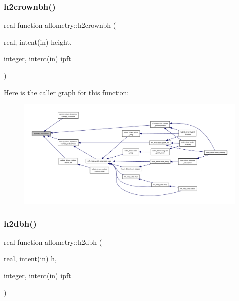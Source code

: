 \subsubsection{\texorpdfstring{h2crownbh()}{h2crownbh()}}
{\footnotesize\ttfamily real function allometry\+::h2crownbh (\begin{DoxyParamCaption}\item[{real, intent(in)}]{height,  }\item[{integer, intent(in)}]{ipft }\end{DoxyParamCaption})}

Here is the caller graph for this function\+:
\nopagebreak
\begin{figure}[H]
\begin{center}
\leavevmode
\includegraphics[width=350pt]{namespaceallometry_a88949ed487fccc2f1dfd065399043b0d_icgraph}
\end{center}
\end{figure}
\mbox{\label{namespaceallometry_a31aa8db06e86ec74efb5e692417399df}} 
\subsubsection{\texorpdfstring{h2dbh()}{h2dbh()}}
{\footnotesize\ttfamily real function allometry\+::h2dbh (\begin{DoxyParamCaption}\item[{real, intent(in)}]{h,  }\item[{integer, intent(in)}]{ipft }\end{DoxyParamCaption})}

